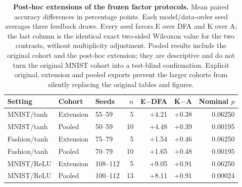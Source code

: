\begin{table}[!htbp]
\centering\small
\setlength{\tabcolsep}{4pt}
\begin{tabular}{@{}lllrrrr@{}}
\toprule
Setting & Cohort & Seeds & $n$ & E$-$DFA & K$-$A & Nominal $p$ \\
\midrule
MNIST/tanh & Extension & 55--59 & 5 & +4.21 & +0.38 & 0.06250 \\
MNIST/tanh & Pooled & 50--59 & 10 & +4.48 & +0.39 & 0.00195 \\
Fashion/tanh & Extension & 75--79 & 5 & +1.54 & +0.46 & 0.06250 \\
Fashion/tanh & Pooled & 70--79 & 10 & +1.65 & +0.48 & 0.00195 \\
MNIST/ReLU & Extension & 108--112 & 5 & +9.05 & +0.91 & 0.06250 \\
MNIST/ReLU & Pooled & 100--112 & 13 & +8.11 & +0.91 & 0.00024 \\
\bottomrule
\end{tabular}
\caption{\textbf{Post-hoc extensions of the frozen factor protocols.} Mean paired accuracy differences in percentage points. Each model/data-order seed averages three feedback draws. Every seed favors E over DFA and K over A; the last column is the identical exact two-sided Wilcoxon value for the two contrasts, without multiplicity adjustment. Pooled results include the original cohort and the post-hoc extension; they are descriptive and do not turn the original MNIST cohort into a test-blind confirmation. Explicit original, extension and pooled exports prevent the larger cohorts from silently replacing the original tables and figures.}
\label{tab:factor_seed_extensions}
\end{table}
